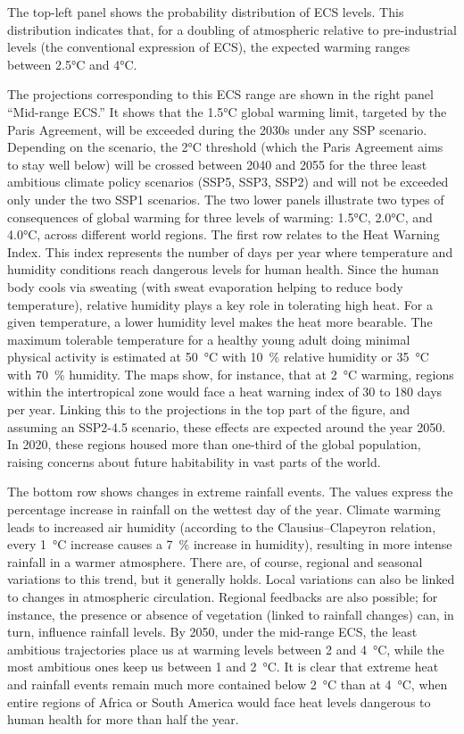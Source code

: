 The top-left panel shows the probability distribution of ECS levels. This distribution indicates that, for a doubling of atmospheric  relative to pre-industrial levels (the conventional expression of ECS), the expected warming ranges between 2.5°C and 4°C.

The projections corresponding to this ECS range are shown in the right panel “Mid-range ECS.” It shows that the 1.5°C global warming limit, targeted by the Paris Agreement, will be exceeded during the 2030s under any SSP scenario. Depending on the scenario, the 2°C threshold (which the Paris Agreement aims to stay well below) will be crossed between 2040 and 2055 for the three least ambitious climate policy scenarios (SSP5, SSP3, SSP2) and will not be exceeded only under the two SSP1 scenarios.
The two lower panels illustrate two types of consequences of global warming for three levels of warming: 1.5°C, 2.0°C, and 4.0°C, across different world regions.
The first row relates to the Heat Warning Index. This index represents the number of days per year where temperature and humidity conditions reach dangerous levels for human health. Since the human body cools via sweating (with sweat evaporation helping to reduce body temperature), relative humidity plays a key role in tolerating high heat. For a given temperature, a lower humidity level makes the heat more bearable. The maximum tolerable temperature for a healthy young adult doing minimal physical activity is estimated at \SI{50}{\degreeCelsius} with \SI{10}{\%} relative humidity or \SI{35}{\degreeCelsius} with \SI{70}{\%} humidity.
The maps show, for instance, that at \SI{2}{\degreeCelsius} warming, regions within the intertropical zone would face a heat warning index of 30 to 180 days per year.
Linking this to the projections in the top part of the figure, and assuming an SSP2-4.5 scenario, these effects are expected around the year 2050. In 2020, these regions housed more than one-third of the global population, raising concerns about future habitability in vast parts of the world.

The bottom row shows changes in extreme rainfall events. The values express the percentage increase in rainfall on the wettest day of the year. Climate warming leads to increased air humidity (according to the Clausius–Clapeyron relation, every \SI{1}{\degreeCelsius} increase causes a \SI{7}{\%} increase in humidity), resulting in more intense rainfall in a warmer atmosphere.
There are, of course, regional and seasonal variations to this trend, but it generally holds. Local variations can also be linked to changes in atmospheric circulation. Regional feedbacks are also possible; for instance, the presence or absence of vegetation (linked to rainfall changes) can, in turn, influence rainfall levels.
By 2050, under the mid-range ECS, the least ambitious trajectories place us at warming levels between \num{2} and \SI{4}{\degreeCelsius}, while the most ambitious ones keep us between \num{1} and \SI{2}{\degreeCelsius}. It is clear that extreme heat and rainfall events remain much more contained below \SI{2}{\degreeCelsius} than at \SI{4}{\degreeCelsius}, when entire regions of Africa or South America would face heat levels dangerous to human health for more than half the year.

